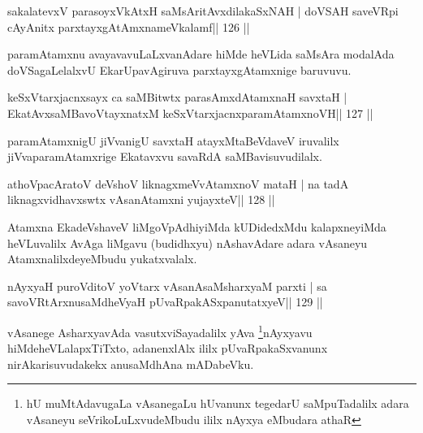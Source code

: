 
\begin{shl}
sakalatevxV parasoyxVkAtxH saMsAritAvxdilakaSxNAH |
doVSAH saveVR\s pi cA\s\s yAnitx parxtayxgAtAmxnameVkalamf\hfill || 126 ||
\end{shl}

\begin{artha}
paramAtamxnu avayavavuLaLxvanAdare hiMde heVLida saMsAra modalAda
doVSagaLelalxvU EkarUpavAgiruva parxtayxgAtamxnige baruvuvu.
\end{artha}

\begin{shl}
keSxVtarxjacnxsayx ca saMBitwtx parasAmxdAtamxnaH savxtaH |
EkatAvxsaMBavoV\s tayxnatxM keSxVtarxjacnxparamAtamxnoVH\hfill || 127 ||
\end{shl}

\begin{artha}
paramAtamxnigU jiVvanigU savxtaH atayxMtaBeVdaveV iruvalilx
jiVvaparamAtamxrige Ekatavxvu savaRdA saMBavisuvudilalx.
\end{artha}


\begin{shl}
athoVpacAratoV deVshoV liknagxmeVvA\s\s tamxnoV mataH |
na tadA liknagxvidhavxswtx vAsanA\s\s tamxni yujayxteV\hfill || 128 ||
\end{shl}

\begin{artha}
Atamxna EkadeVshaveV liMgoVpAdhiyiMda kUDidedxMdu kalapxneyiMda heVLuvalilx AvAga liMgavu (budidhxyu) nAshavAdare adara vAsaneyu AtamxnalilxdeyeMbudu yukatxvalalx.
\end{artha}

\begin{shl}
nAyxyaH puroVditoV yoV\s tarx vAsanAsaMsharxyaM parxti |
sa savoVR\s tArxnusaMdheVyaH pUvaRpakASxpanutatxyeV\hfill || 129 ||
\end{shl}

\begin{artha}
vAsanege AsharxyavAda vasutxviSayadalilx yAva \footnote{hU muMtAdavugaLa vAsanegaLu hUvanunx tegedarU saMpuTadalilx adara vAsaneyu seVrikoLuLxvudeMbudu ililx nAyxya eMbudara athaR}nAyxyavu hiMde\break heVLalapxTiTxto, adanenxlAlx ililx pUvaRpakaSxvanunx nirAkarisuvudakekx anusaMdhAna mADabeVku.
\end{artha}


